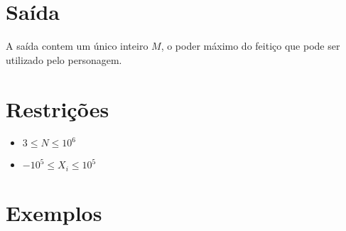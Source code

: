 \section*{Saída}

A saída contem um único inteiro $M$, o poder máximo do feitiço que pode ser utilizado pelo personagem.

\section*{Restrições}

\begin{itemize}
\item $3 \leq N \leq 10^6$
\item $-10^5 \leq X_i \leq 10^5$
\end{itemize}


\section*{Exemplos}

\exemplo
